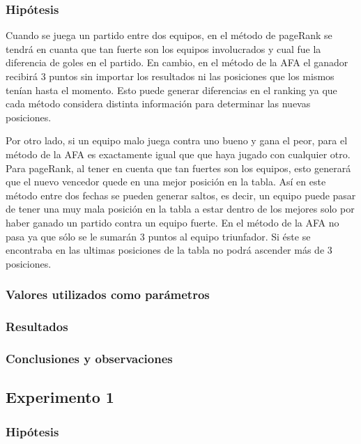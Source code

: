		\subsubsection*{Hipótesis} 
		Cuando se juega un partido entre dos equipos, en el método de pageRank se tendrá en cuanta que tan fuerte son los equipos involucrados y cual fue la diferencia de goles en el partido. En cambio, en el método de la AFA el ganador recibirá 3 puntos sin importar los resultados ni las posiciones que los mismos tenían hasta el momento. Esto puede generar diferencias en el ranking ya que cada método considera distinta información para determinar las nuevas posiciones. 
		
		Por otro lado, si un equipo malo juega contra uno bueno y gana el peor, para el método de la AFA es exactamente igual que que haya jugado con cualquier otro. Para pageRank, al tener en cuenta que tan fuertes son los equipos, esto generará que el nuevo vencedor quede en una mejor posición en la tabla. Así en este método entre dos fechas se pueden generar saltos, es decir, un equipo puede pasar de tener una muy mala posición en la tabla a estar dentro de los mejores solo por haber ganado un partido contra un equipo fuerte. En el método de la AFA no pasa ya que sólo se le sumarán 3 puntos al equipo triunfador. Si éste se encontraba en las ultimas posiciones de la tabla no podrá ascender más de 3 posiciones. 		

		\subsubsection*{Valores utilizados como parámetros} 

		\subsubsection*{Resultados}

		\subsubsection*{Conclusiones y observaciones} 

	\subsection{Experimento 1}

		\subsubsection*{Hipótesis}
